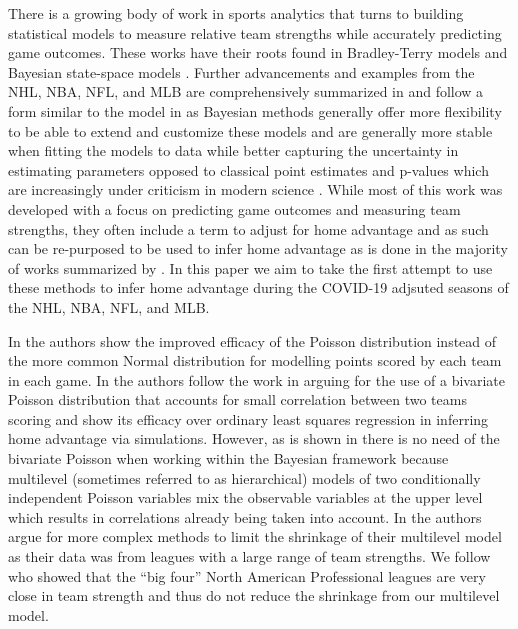 There is a growing body of work in sports analytics that turns to building statistical models to measure relative team strengths while accurately predicting game outcomes. These works have their roots found in Bradley-Terry models \cite{Bradley1952} and Bayesian state-space models \cite{Glickman1998}. Further advancements and examples from the NHL, NBA, NFL, and MLB are comprehensively summarized in \cite{Lopez2018} and follow a form similar to the model in \cite{Baio2010} as Bayesian methods generally offer more flexibility to be able to extend and customize these models and are generally more stable when fitting the models to data \cite{GlickmanText2017} while better capturing the uncertainty in estimating parameters opposed to classical point estimates and p-values which are increasingly under criticism in modern science \cite{Ioannidis2005} \cite{Begley2015}. While most of this work was developed with a focus on predicting game outcomes and measuring team strengths, they often include a term to adjust for home advantage and as such can be re-purposed to be used to infer home advantage as is done in the majority of works summarized by \cite{Benz2020}. In this paper we aim to take the first attempt to use these methods to infer home advantage during the COVID-19 adjsuted seasons of the NHL, NBA, NFL, and MLB.

In \cite{Lopez2018} the authors show the improved efficacy of the Poisson distribution instead of the more common Normal distribution \cite{GlickmanText2017} for modelling points scored by each team in each game. In \cite{Benz2020} the authors follow the work in \cite{Karlis2003} arguing for the use of a bivariate Poisson distribution that accounts for small correlation between two teams scoring and show its efficacy over ordinary least squares regression in inferring home advantage via simulations. However, as is shown in \cite{Baio2010} there is no need of the bivariate Poisson when working within the Bayesian framework because multilevel (sometimes referred to as hierarchical) models of two conditionally independent Poisson variables mix the observable variables at the upper level which results in correlations already being taken into account. In \cite{Baio2010} the authors argue for more complex methods to limit the shrinkage of their multilevel model as their data was from leagues with a large range of team strengths. We follow \cite{Lopez2018} who showed that the ``big four'' North American Professional leagues are very close in team strength and thus do not reduce the shrinkage from our multilevel model.

